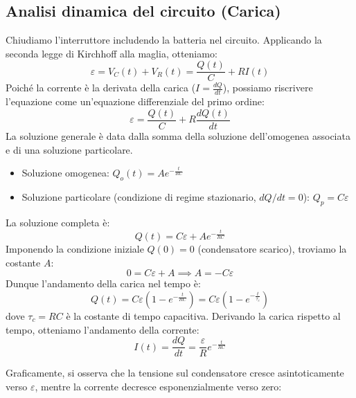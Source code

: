 \documentclass{book}
\begin{document}
\subsection*{Analisi dinamica del circuito (Carica)}
Chiudiamo l'interruttore includendo la batteria nel circuito. Applicando la seconda legge di Kirchhoff alla maglia, otteniamo:
$$
\varepsilon = V_C(t) + V_R(t) = \frac{Q(t)}{C} + R I(t)
$$
Poiché la corrente è la derivata della carica ($I = \frac{dQ}{dt}$), possiamo riscrivere l'equazione come un'equazione differenziale del primo ordine:
$$
\varepsilon = \frac{Q(t)}{C} + R\frac{dQ(t)}{dt}
$$
La soluzione generale è data dalla somma della soluzione dell'omogenea associata e di una soluzione particolare.
\begin{itemize}
    \item Soluzione omogenea: $Q_o(t) = A e^{-\frac{t}{RC}}$
    \item Soluzione particolare (condizione di regime stazionario, $dQ/dt = 0$): $Q_p = C\varepsilon$
\end{itemize}
La soluzione completa è:
$$
Q(t) = C\varepsilon + A e^{-\frac{t}{RC}}
$$
Imponendo la condizione iniziale $Q(0)=0$ (condensatore scarico), troviamo la costante $A$:
$$
0 = C\varepsilon + A \implies A = -C\varepsilon
$$
Dunque l'andamento della carica nel tempo è:
$$
Q(t) = C\varepsilon \left(1 - e^{-\frac{t}{RC}}\right) = C\varepsilon \left(1 - e^{-\frac{t}{\tau_c}}\right)
$$
dove $\tau_c = RC$ è la costante di tempo capacitiva.
Derivando la carica rispetto al tempo, otteniamo l'andamento della corrente:
$$
I(t) = \frac{dQ}{dt} = \frac{\varepsilon}{R} e^{-\frac{t}{RC}}
$$

Graficamente, si osserva che la tensione sul condensatore cresce asintoticamente verso $\varepsilon$, mentre la corrente decresce esponenzialmente verso zero:
\end{document}
